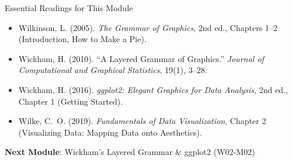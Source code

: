 \documentclass[10pt]{beamer}
\begin{document}
\begin{frame}{Essential Readings for This Module}
  \begin{itemize}
    \item Wilkinson, L. (2005). \emph{The Grammar of Graphics}, 2nd ed.,
          Chapters 1--2 (Introduction, How to Make a Pie).
    \item Wickham, H. (2010). ``A Layered Grammar of Graphics.''
          \emph{Journal of Computational and Graphical Statistics}, 19(1), 3--28.
    \item Wickham, H. (2016). \emph{ggplot2: Elegant Graphics for Data
          Analysis}, 2nd ed., Chapter 1 (Getting Started).
    \item Wilke, C.~O. (2019). \emph{Fundamentals of Data Visualization},
          Chapter 2 (Visualizing Data: Mapping Data onto Aesthetics).
  \end{itemize}

  \vspace{6pt}
  \textbf{Next Module}: Wickham's Layered Grammar \& ggplot2 (W02-M02)
\end{frame}
\end{document}
